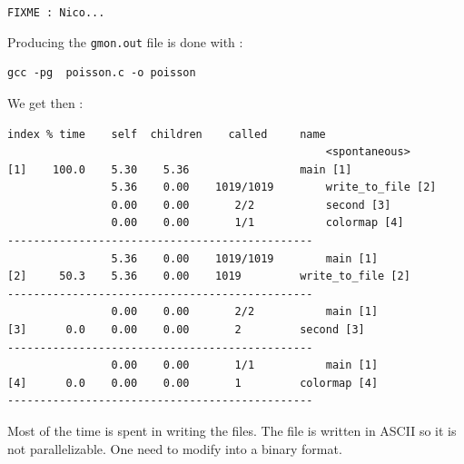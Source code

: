 \documentclass[11pt,a4paper]{article}
\begin{document}

\noindent 

\begin{exercise}[Debugging]

{\tt FIXME : Nico...}

\end{exercise}



\begin{exercise}[Profiling] 
Producing the \verb+gmon.out+ file is done with :

\begin{verbatim}
gcc -pg  poisson.c -o poisson
\end{verbatim}

We get then :

\begin{verbatim}
index % time    self  children    called     name
                                                 <spontaneous>
[1]    100.0    5.30    5.36                 main [1]
                5.36    0.00    1019/1019        write_to_file [2]
                0.00    0.00       2/2           second [3]
                0.00    0.00       1/1           colormap [4]
-----------------------------------------------
                5.36    0.00    1019/1019        main [1]
[2]     50.3    5.36    0.00    1019         write_to_file [2]
-----------------------------------------------
                0.00    0.00       2/2           main [1]
[3]      0.0    0.00    0.00       2         second [3]
-----------------------------------------------
                0.00    0.00       1/1           main [1]
[4]      0.0    0.00    0.00       1         colormap [4]
-----------------------------------------------
\end{verbatim}

Most of the time is spent in writing the files. The file is written in ASCII so it is not parallelizable. One need to modify into a binary format. 

\end{exercise}

\end{document}
